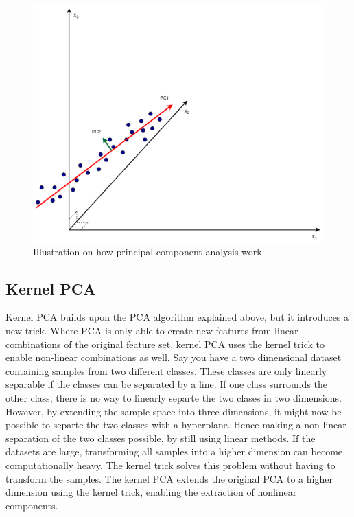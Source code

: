         \begin{figure}
            \centering
            \includegraphics[width=\textwidth]{report/figures/techniques/PCA.pdf}
            \caption{Illustration on how principal component analysis work}
            \label{fig:tech:PCA}
        \end{figure}
        
    
    \subsection{Kernel PCA}\label{subsec:kernelPCA}
        Kernel PCA builds upon the PCA algorithm explained above, but it introduces a new trick. Where PCA is only able to create new features from linear combinations of the original feature set, kernel PCA uses the kernel trick to enable non-linear combinations as well. Say you have a two dimensional dataset containing samples from two different classes.  These classes are only linearly separable if the classes can be separated by a line. If one class surrounds the other class, there is no way to linearly separte the two clases in two dimensions. However, by extending the sample space into three dimensions, it might now be possible to separte the two classes with a hyperplane. Hence making a non-linear separation of the two classes possible, by still using linear methods. If the datasets are large, transforming all samples into a higher dimension can become computationally heavy. The kernel trick solves this problem without having to transform the samples. The kernel PCA extends the original PCA to a higher dimension using the kernel trick, enabling the extraction of nonlinear components.  
    
